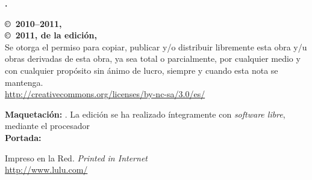 \noindent
\textbf{\titlename. \subtitlename}\\
\authorname

\footnotesize

\bigskip\bigskip\noindent
\textbf{\copyright\ 2010--2011, \authorname}\\
\textbf{\copyright\ 2011, de la edición, \editorname}\\
Se otorga el permiso para copiar, publicar y/o distribuir libremente esta obra y/u obras derivadas de esta obra, ya sea total o parcialmente, por cualquier medio y con cualquier propósito sin ánimo de lucro, siempre y cuando esta nota se mantenga.\\
{\selectfont\url{http://creativecommons.org/licenses/by-nc-sa/3.0/es/}}

\bigskip\noindent
\textbf{Maquetación:} \editorname. La edición se ha realizado íntegramente con \emph{software libre}, mediante el procesador \emph{\LaTeXe}\\
\textbf{Portada:} \coverauthorname

\bigskip\noindent
Impreso en la Red. \emph{Printed in Internet}\\
{\selectfont\url{http://www.lulu.com/}}

\normalsize

\endinput
